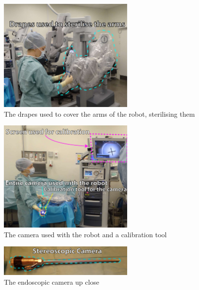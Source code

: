 \begin{figure}[H]
	\centering
	\includegraphics[width=0.6\textwidth]{FieldStudies/figures/drapes.pdf}
	\caption{The drapes used to cover the arms of the robot, sterilising them}
	\label{fig:drapes}
\end{figure} 

\begin{figure}[H]
	\centering
	\includegraphics[width=0.6\textwidth]{FieldStudies/figures/camera.pdf}
	\caption{The camera used with the robot and a calibration tool}
	\label{fig:camera}
\end{figure}

\begin{figure}[H]
	\centering
	\includegraphics[width=0.6\textwidth]{FieldStudies/figures/camera_close}
	\caption{The endoscopic camera up close}
	\label{fig:cam_close}
\end{figure}

